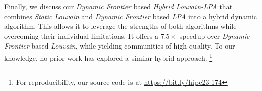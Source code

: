 Finally, we discuss our \textit{Dynamic Frontier} based \textit{Hybrid Louvain-LPA} that combines \textit{Static Louvain} and \textit{Dynamic Frontier} based \textit{LPA} into a hybrid dynamic algorithm. This allows it to leverage the strengths of both algorithms while overcoming their individual limitations. It offers a $7.5\times$ speedup over \textit{Dynamic Frontier} based \textit{Louvain}, while yielding communities of high quality. To our knowledge, no prior work has explored a similar hybrid approach. \footnote{For reproducibility, our source code is at \url{https://bit.ly/hipc23-174}}










